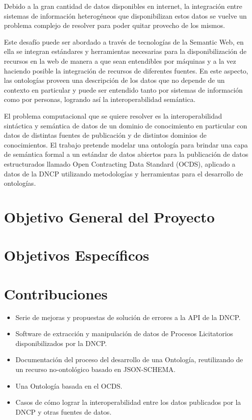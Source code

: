 Debido a la gran cantidad de datos disponibles en internet, la integración entre sistemas de información heterogéneos que disponibilizan estos datos se vuelve un problema complejo de resolver para poder quitar provecho de los mismos. 

Este desafío puede ser abordado a través de tecnologías de la Semantic Web, en ella se integran estándares y herramientas necesarias para la disponibilización de recursos en la web de manera a que sean entendibles por máquinas y a la vez haciendo posible la integración de recursos de diferentes fuentes. En este aspecto, las ontologías proveen una descripción de los datos que no depende de un contexto en particular y puede ser entendido tanto por sistemas de información como por personas, logrando así la interoperabilidad semántica.

El problema computacional que se quiere resolver es la interoperabilidad sintáctica y semántica de datos de un dominio de conocimiento en particular con datos de distintas fuentes de publicación y de distintos dominios de conocimientos. El trabajo pretende modelar una ontología para brindar una capa de semántica formal a un estándar de datos abiertos para la publicación de datos estructurados llamado Open Contracting Data Standard (OCDS), aplicado a datos de la DNCP utilizando metodologías y herramientas para el desarrollo de ontologías. 


\section{Objetivo General del Proyecto}



\section{Objetivos Específicos}
\label{objetivos}



\section{Contribuciones}
\label{Contribuciones}
\begin{itemize}
\item Serie de mejoras y propuestas de solución de errores a la API de la DNCP.
\item Software de extracción y manipulación de datos de Procesos Licitatorios disponibilizados por la DNCP.
\item Documentación del proceso del desarrollo de una Ontología, reutilizando de un recurso no-ontológico basado en JSON-SCHEMA.
\item Una Ontología basada en el OCDS.
\item Casos de cómo lograr la interoperabilidad entre los datos publicados por la DNCP y otras fuentes de datos.
\end{itemize}
 

